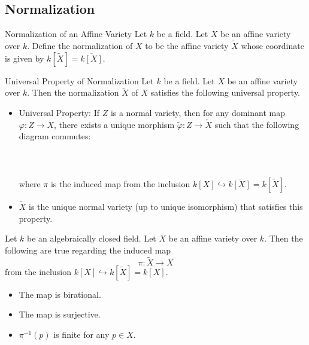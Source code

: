 \documentclass[a4paper]{article}
\begin{document}
\subsection{Normalization}
\begin{defn}{Normalization of an Affine Variety}{} Let $k$ be a field. Let $X$ be an affine variety over $k$. Define the normalization of $X$ to be the affine variety $\widetilde{X}$ whose coordinate is given by $k[\widetilde{X}]=\overline{k[X]}$. 
\end{defn}

\begin{prp}{Universal Property of Normalization}{} Let $k$ be a field. Let $X$ be an affine variety over $k$. Then the normalization $\widetilde{X}$ of $X$ satisfies the following universal property. 
\begin{itemize}
\item Universal Property: If $Z$ is a normal variety, then for any dominant map $\varphi:Z\to X$, there exists a unique morphism $\widetilde{\varphi}:Z\to\widetilde{X}$ such that the following diagram commutes: \\~\\
\\~\\
where $\pi$ is the induced map from the inclusion $k[X]\hookrightarrow\overline{k[X]}=k[\widetilde{X}]$. 
\item $\widetilde{X}$ is the unique normal variety (up to unique isomorphism) that satisfies this property. 
\end{itemize}
\end{prp}

\begin{prp}{}{} Let $k$ be an algebraically closed field. Let $X$ be an affine variety over $k$. Then the following are true regarding the induced map $$\pi:\widetilde{X}\to X$$ from the inclusion $k[X]\hookrightarrow k[\widetilde{X}]=\overline{k[X]}$. 
\begin{itemize}
\item The map is birational. 
\item The map is surjective. 
\item $\pi^{-1}(p)$ is finite for any $p\in X$. 
\end{itemize}
\end{prp}
\end{document}
